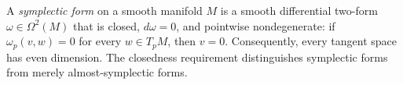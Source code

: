 
A \emph{symplectic form} on a smooth manifold $M$ is a smooth differential two-form $\omega\in\Omega^2(M)$ that is closed, $d\omega=0$, and pointwise nondegenerate: if $\omega_p(v,w)=0$ for every $w\in T_pM$, then $v=0$. Consequently, every tangent space has even dimension. The closedness requirement distinguishes symplectic forms from merely almost-symplectic forms.
